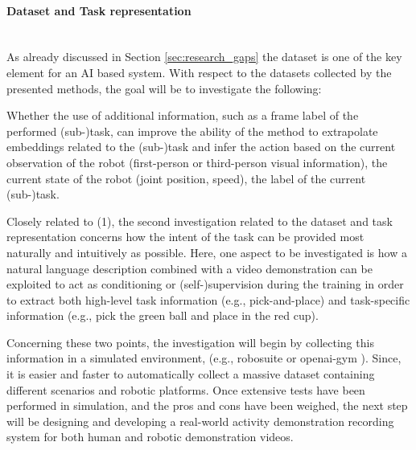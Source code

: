 \paragraph{Dataset and Task representation} \mbox{} \\
As already discussed in Section \ref{sec:research_gaps} the dataset is one of the key element for an AI based system. With respect to the datasets collected by the presented methods, the goal will be to investigate the following:
    \begin{enumerate*}[label=\textbf{(\arabic*)}]
    \item Whether the use of additional information, such as a frame label of the performed (sub-)task, can improve the ability of the method to extrapolate embeddings related to the (sub-)task and infer the action based on the current observation of the robot (first-person or third-person visual information), the current state of the robot (joint position, speed), the label of the current (sub-)task. 
    \item Closely related to (1), the second investigation related to the dataset and task representation concerns how the intent of the task can be provided most naturally and intuitively as possible. Here, one aspect to be investigated is how a natural language description combined with a video demonstration can be exploited to act as conditioning or (self-)supervision during the training in order to extract both high-level task information (e.g., pick-and-place) and task-specific information (e.g., pick the green ball and place in the red cup).
    \end{enumerate*} Concerning these two points, the investigation will begin by collecting this information in a simulated environment, (e.g., robosuite \cite{zhu2020robosuite} or openai-gym \cite{brockman2016openai}). Since, it is easier and faster to automatically collect a massive dataset containing different scenarios and robotic platforms. Once extensive tests have been performed in simulation, and the pros and cons have been weighed, the next step will be designing and developing a real-world activity demonstration recording system for both human and robotic demonstration videos.  
